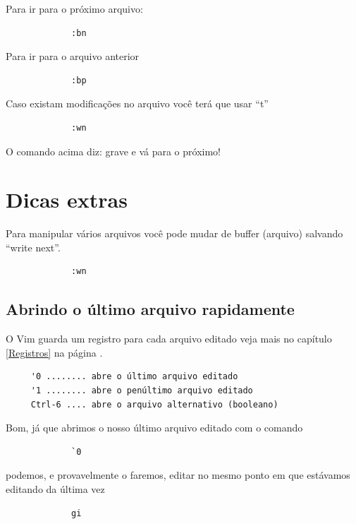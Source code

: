 \documentclass[10pt,a4paper,openany]{book}
\begin{document}
Para ir para o próximo arquivo:

\begin{verbatim}
			 :bn
\end{verbatim}

Para ir para o arquivo anterior

\begin{verbatim}
			 :bp
\end{verbatim}

Caso existam modificações no arquivo você terá que usar ``t''

\begin{verbatim}
			 :wn
\end{verbatim}

O comando acima diz: grave e vá para o próximo!

\section{Dicas extras}
\label{Dicas extras}

Para manipular vários arquivos você pode mudar de buffer (arquivo)
salvando ``write next''.

\begin{verbatim}
			 :wn
\end{verbatim}



\subsection{Abrindo o último arquivo rapidamente}
O Vim guarda um registro para cada arquivo editado veja
mais no capítulo \ref{Registros} na página \pageref{Registros}.

\begin{verbatim}
	 '0 ........ abre o último arquivo editado
	 '1 ........ abre o penúltimo arquivo editado
	 Ctrl-6 .... abre o arquivo alternativo (booleano)
\end{verbatim}

Bom, já que abrimos o nosso último arquivo editado com o comando

\begin{verbatim}
			 `0
\end{verbatim}

podemos, e provavelmente o faremos, editar no mesmo ponto em que estávamos
editando da última vez

\begin{verbatim}
			 gi
\end{verbatim}
\end{document}
